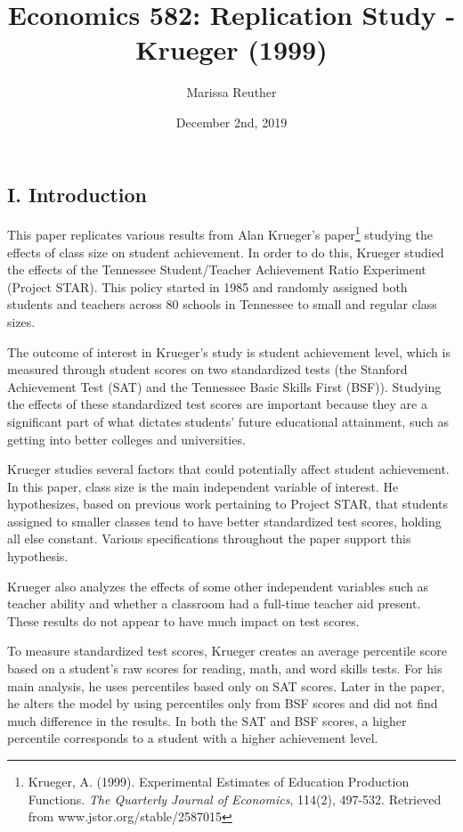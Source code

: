 \documentclass[a4paper,11pt]{article}
\begin{document}
\title{Economics 582: Replication Study - Krueger (1999)}
\author{Marissa Reuther}
\date{December 2nd, 2019}
\maketitle

\subsection*{I. Introduction}
This paper replicates various results from Alan Krueger's paper\footnote{Krueger, A. (1999). Experimental Estimates of Education Production Functions. \textit{The Quarterly Journal of Economics}, 114(2), 497-532. Retrieved from www.jstor.org/stable/2587015}  studying the effects of class size on student achievement. In order to do this, Krueger studied the effects of the Tennessee Student/Teacher Achievement Ratio Experiment (Project STAR). This policy started in 1985 and randomly assigned both students and teachers across 80 schools in Tennessee to small and regular class sizes. \par

The outcome of interest in Krueger’s study is student achievement level, which is  measured through student scores on two standardized tests (the Stanford Achievement
Test (SAT) and the Tennessee Basic Skills First (BSF)). Studying the effects of these standardized test scores are important because they are a significant part of what dictates students’ future educational attainment, such as getting into better colleges and universities.  \par

Krueger studies several factors that could potentially affect student achievement. In this paper, class size is the main independent variable of interest. He hypothesizes, based on previous work pertaining to Project STAR, that students assigned to smaller classes tend to have better standardized test scores, holding all else constant. Various specifications throughout the paper support this hypothesis. \par

Krueger also analyzes the effects of some other independent variables such as teacher ability and whether a classroom had a full-time teacher aid present. These results do not appear to have much impact on test scores. \par

To measure standardized test scores, Krueger creates an average percentile score based on a student's raw scores for reading, math, and word skills tests. For his main analysis, he uses percentiles based only on SAT scores. Later in the paper, he alters the model by using percentiles only from BSF scores and did not find much difference in the results. In both the SAT and BSF scores, a higher percentile corresponds to a student with a higher achievement level. \par
\end{document}
